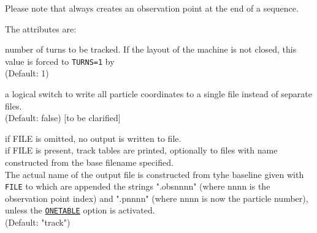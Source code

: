 Please note that \madx always creates an observation point at the end of a
sequence.


The attributes are:
\begin{madlist}
    number of turns to be tracked. If the layout of the
   machine is not closed, this value is forced to \texttt{TURNS=1} by \ptc 
   \\ (Default: 1)
     
   \label{opt:onetable2} a logical switch to write all
   particle coordinates to a single file instead of separate files. \\
   (Default: false) [to be clarified]

    if FILE is omitted, no output is written to file.\\
   if FILE is present, track tables are printed, optionally to 
   files with name constructed from the base filename specified. \\
   The actual name of the output file is constructed from
   tyhe baseline given with \texttt{FILE} to which are appended the
   strings ".obsnnnn" (where nnnn is the observation point index) and
   ".pnnnn" (where nnnn is now the particle number), unless the
   \hyperref[opt:onetable2]{\texttt{ONETABLE}} option is activated.  \\
   (Default: "track") 


\end{madlist}
